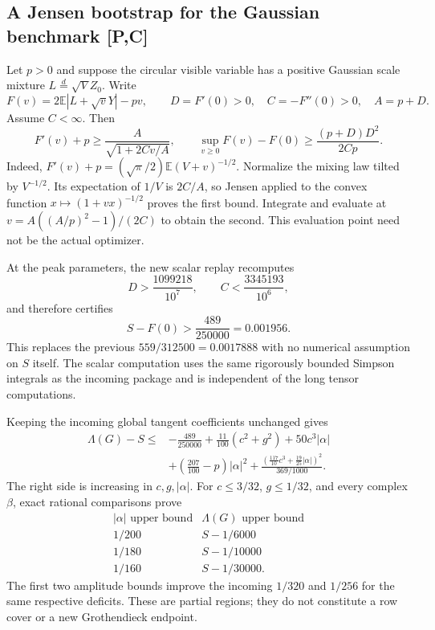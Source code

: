 \subsection{A Jensen bootstrap for the Gaussian benchmark [P,C]}
Let $p>0$ and suppose the circular visible variable has a positive
Gaussian scale mixture $L\stackrel{d}=\sqrt V Z_0$. Write
\[
 F(v)=2\mathbb E|L+\sqrt vY|-pv,\qquad
 D=F'(0)>0,\quad C=-F''(0)>0,\quad A=p+D.
\]
Assume $C<\infty$. Then
\begin{equation}\label{eq:shift-baseline-jensen}
 F'(v)+p\ge\frac A{\sqrt{1+2Cv/A}},\qquad
 \sup_{v\ge0}F(v)-F(0)\ge\frac{(p+D)D^2}{2Cp}.
\end{equation}
Indeed,
$F'(v)+p=(\sqrt\pi/2)\mathbb E(V+v)^{-1/2}$.
Normalize the mixing law tilted by $V^{-1/2}$. Its expectation of
$1/V$ is $2C/A$, so Jensen applied to the convex function
$x\mapsto(1+vx)^{-1/2}$ proves the first bound. Integrate and evaluate at
$v=A((A/p)^2-1)/(2C)$ to obtain the second. This evaluation point need
not be the actual optimizer.

At the peak parameters, the new scalar replay recomputes
\[
 D>\frac{1099218}{10^7},\qquad C<\frac{3345193}{10^6},
\]
and therefore certifies
\begin{equation}\label{eq:shift-gap-improved}
 S-F(0)>\frac{489}{250000}=0.001956.
\end{equation}
This replaces the previous $559/312500=0.0017888$ with no numerical
assumption on $S$ itself. The scalar computation uses the same rigorously
bounded Simpson integrals as the incoming package and is independent of
the long tensor computations.

Keeping the incoming global tangent coefficients unchanged gives
\[
\begin{aligned}
\Lambda(G)-S\le{}&-\frac{489}{250000}
 +\frac{11}{100}(c^2+g^2)+50c^3|\alpha|\\
&+\left(\frac{207}{100}-p\right)|\alpha|^2
 +\frac{\left(\frac{117}{10}c^3+\frac{19}{25}|\alpha|\right)^2}{369/1000}.
\end{aligned}
\]
The right side is increasing in $c,g,|\alpha|$. For
$c\le3/32$, $g\le1/32$, and every complex $\beta$, exact rational
comparisons prove
\[
\begin{array}{c|c}
 |\alpha|\text{ upper bound}&\Lambda(G)\text{ upper bound}\\\hline
 1/200&S-1/6000\\
 1/180&S-1/10000\\
 1/160&S-1/30000.
\end{array}
\]
The first two amplitude bounds improve the incoming $1/320$ and $1/256$
for the same respective deficits. These are partial regions; they do not
constitute a row cover or a new Grothendieck endpoint.

